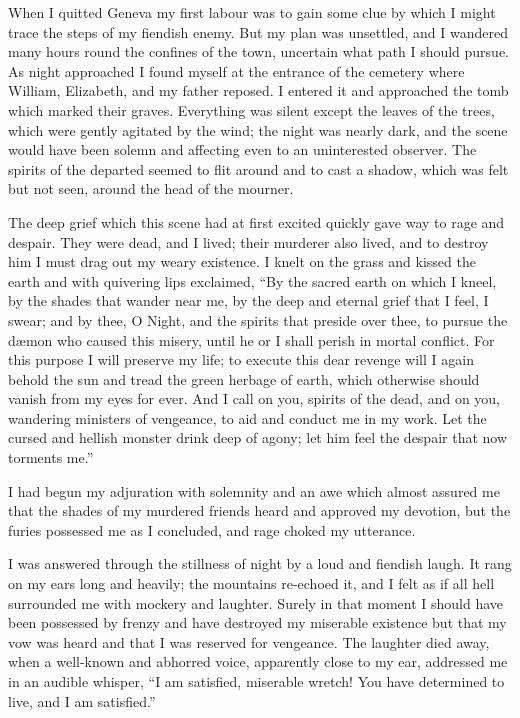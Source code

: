 \documentclass[12pt,openright]{book}
\begin{document}
When I quitted Geneva my first labour was to gain some clue by which I might trace the steps of my fiendish enemy. But my plan was unsettled, and I wandered many hours round the confines of the town, uncertain what path I should pursue. As night approached I found myself at the entrance of the cemetery where William, Elizabeth, and my father reposed. I entered it and approached the tomb which marked their graves. Everything was silent except the leaves of the trees, which were gently agitated by the wind; the night was nearly dark, and the scene would have been solemn and affecting even to an uninterested observer. The spirits of the departed seemed to flit around and to cast a shadow, which was felt but not seen, around the head of the mourner.

The deep grief which this scene had at first excited quickly gave way to rage and despair. They were dead, and I lived; their murderer also lived, and to destroy him I must drag out my weary existence. I knelt on the grass and kissed the earth and with quivering lips exclaimed, “By the sacred earth on which I kneel, by the shades that wander near me, by the deep and eternal grief that I feel, I swear; and by thee, O Night, and the spirits that preside over thee, to pursue the dæmon who caused this misery, until he or I shall perish in mortal conflict. For this purpose I will preserve my life; to execute this dear revenge will I again behold the sun and tread the green herbage of earth, which otherwise should vanish from my eyes for ever. And I call on you, spirits of the dead, and on you, wandering ministers of vengeance, to aid and conduct me in my work. Let the cursed and hellish monster drink deep of agony; let him feel the despair that now torments me.”

I had begun my adjuration with solemnity and an awe which almost assured me that the shades of my murdered friends heard and approved my devotion, but the furies possessed me as I concluded, and rage choked my utterance.

I was answered through the stillness of night by a loud and fiendish laugh. It rang on my ears long and heavily; the mountains re-echoed it, and I felt as if all hell surrounded me with mockery and laughter. Surely in that moment I should have been possessed by frenzy and have destroyed my miserable existence but that my vow was heard and that I was reserved for vengeance. The laughter died away, when a well-known and abhorred voice, apparently close to my ear, addressed me in an audible whisper, “I am satisfied, miserable wretch! You have determined to live, and I am satisfied.”
\end{document}
